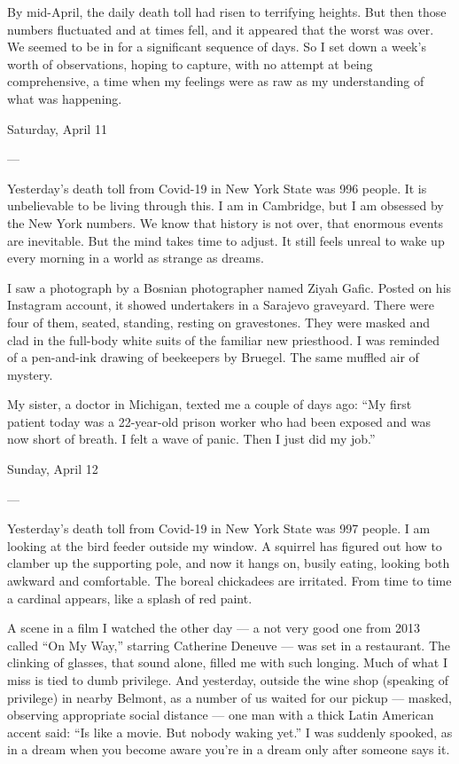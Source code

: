 By mid-April, the daily death toll had risen to terrifying heights. But
then those numbers fluctuated and at times fell, and it appeared that
the worst was over. We seemed to be in for a significant sequence of
days. So I set down a week's worth of observations, hoping to capture,
with no attempt at being comprehensive, a time when my feelings were as
raw as my understanding of what was happening.

Saturday, April 11

---

Yesterday's death toll from Covid-19 in New York State was 996 people.
It is unbelievable to be living through this. I am in Cambridge, but I
am obsessed by the New York numbers. We know that history is not over,
that enormous events are inevitable. But the mind takes time to adjust.
It still feels unreal to wake up every morning in a world as strange as
dreams.

I saw a photograph by a Bosnian photographer named Ziyah Gafic. Posted
on his Instagram account, it showed undertakers in a Sarajevo graveyard.
There were four of them, seated, standing, resting on gravestones. They
were masked and clad in the full-body white suits of the familiar new
priesthood. I was reminded of a pen-and-ink drawing of beekeepers by
Bruegel. The same muffled air of mystery.

My sister, a doctor in Michigan, texted me a couple of days ago: ``My
first patient today was a 22-year-old prison worker who had been exposed
and was now short of breath. I felt a wave of panic. Then I just did my
job.''

Sunday, April 12

---

Yesterday's death toll from Covid-19 in New York State was 997 people. I
am looking at the bird feeder outside my window. A squirrel has figured
out how to clamber up the supporting pole, and now it hangs on, busily
eating, looking both awkward and comfortable. The boreal chickadees are
irritated. From time to time a cardinal appears, like a splash of red
paint.

A scene in a film I watched the other day --- a not very good one from
2013 called ``On My Way,'' starring Catherine Deneuve --- was set in a
restaurant. The clinking of glasses, that sound alone, filled me with
such longing. Much of what I miss is tied to dumb privilege. And
yesterday, outside the wine shop (speaking of privilege) in nearby
Belmont, as a number of us waited for our pickup --- masked, observing
appropriate social distance --- one man with a thick Latin American
accent said: ``Is like a movie. But nobody waking yet.'' I was suddenly
spooked, as in a dream when you become aware you're in a dream only
after someone says it.

